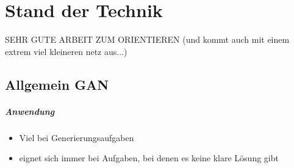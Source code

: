 
\chapter{Stand der Technik}

SEHR GUTE ARBEIT ZUM ORIENTIEREN (und kommt auch mit einem extrem viel kleineren netz aus...) \cite{gan-conditional}

\section{Allgemein GAN}

\paragraph{Anwendung}
\begin{itemize}
	\item Viel bei Generierungsaufgaben
	\item eignet sich immer bei Aufgaben, bei denen es keine klare Lösung gibt
\end{itemize}


